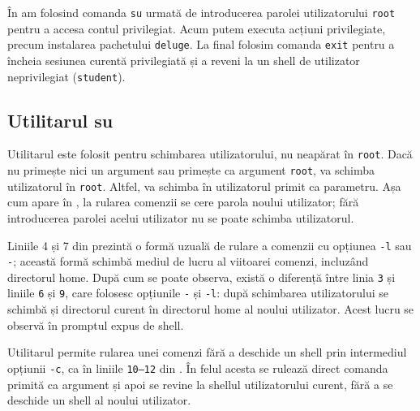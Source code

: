 În  am folosind comanda \texttt{su} urmată de introducerea parolei utilizatorului \texttt{root} pentru a accesa contul privilegiat. Acum putem executa acțiuni privilegiate, precum instalarea pachetului \texttt{deluge}. La final folosim comanda \texttt{exit} pentru a încheia sesiunea curentă privilegiată și a reveni la un shell de utilizator neprivilegiat (\texttt{student}).

\subsection{Utilitarul su}
\label{sec:user:su}

Utilitarul  este folosit pentru schimbarea utilizatorului, nu neapărat în
\texttt{root}. Dacă  nu primește nici un argument sau primește ca argument \texttt{root}, va
schimba utilizatorul în \texttt{root}. Altfel, va schimba în utilizatorul primit ca
parametru. Așa cum apare în , la rularea comenzii  se cere parola noului utilizator; fără
introducerea parolei acelui utilizator nu se poate schimba utilizatorul.


Liniile 4 și 7 din  prezintă o formă uzuală de rulare a comenzii  cu opțiunea \texttt{-l} sau \texttt{-}; această formă schimbă mediul de
lucru al viitoarei comenzi, incluzând directorul home. După cum se poate observa, există o diferență între linia \texttt{3} și liniile \texttt{6} și \texttt{9}, care folosesc opțiunile \texttt{-} și \texttt{-l}: după schimbarea utilizatorului se schimbă și directorul curent în directorul home al noului utilizator. Acest lucru se observă în promptul expus de shell.

Utilitarul  permite rularea unei comenzi fără a deschide un shell prin
intermediul opțiunii \texttt{-c}, ca în liniile \texttt{10--12} din . În felul acesta se rulează direct comanda primită ca
argument și apoi se revine la shellul utilizatorului curent, fără a se deschide
un shell al noului utilizator.

